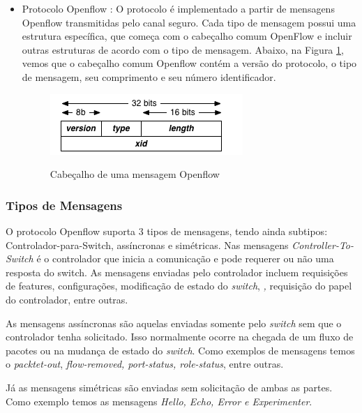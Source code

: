 \begin{itemize}
\begin{itemize}
        \end{itemize}{}
    \item Protocolo Openflow : O protocolo é implementado a partir de mensagens Openflow transmitidas pelo canal seguro. Cada tipo de mensagem possui uma estrutura específica, que começa com o cabeçalho comum OpenFlow e incluir outras estruturas de acordo com o tipo de mensagem. Abaixo, na Figura \ref{headerOpenflow}, vemos que o cabeçalho comum Openflow contém a versão do protocolo, o tipo de mensagem, seu comprimento e seu número identificador.
    
    
\begin{figure}[!h]
    \caption{Cabeçalho de uma mensagem Openflow}
    \centering
    \includegraphics[scale=0.7]{Imagens/headerOpenflow.png}
    \label{headerOpenflow}
\end{figure}
      
\end{itemize}{}

\subsubsection{Tipos de Mensagens}    

O protocolo Openflow suporta 3 tipos de mensagens, tendo ainda subtipos: Controlador-para-Switch, assíncronas e simétricas. Nas mensagens \textit{Controller-To-Switch} é o controlador que inicia a comunicação e pode requerer ou não uma resposta do switch. As mensagens enviadas pelo controlador incluem requisições de features, configurações, modificação de estado do \textit{switch}, \textit, requisição do papel do controlador, entre outras.

As mensagens assíncronas são aquelas enviadas somente pelo \textit{switch} sem que o controlador tenha solicitado. Isso normalmente ocorre na chegada de um fluxo de pacotes ou na mudança de estado do \textit{switch}. Como exemplos de mensagens temos o \textit{packtet-out}, \textit{flow-removed, port-status, role-status}, entre outras.

Já as mensagens simétricas são enviadas sem solicitação de ambas as partes. Como exemplo temos as mensagens \textit{Hello, Echo, Error e Experimenter}.


